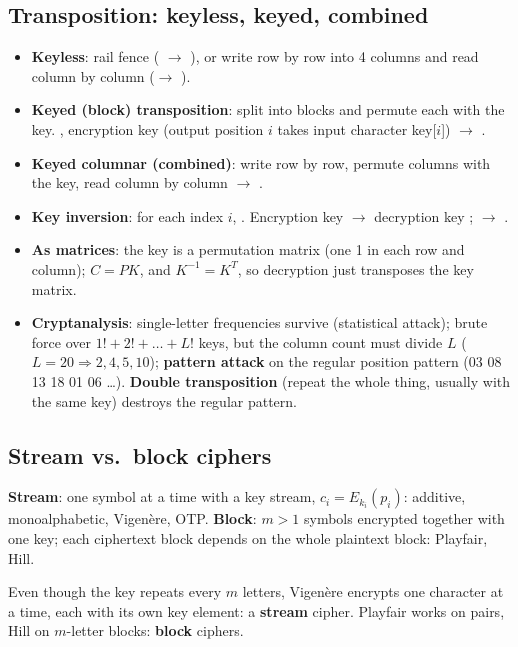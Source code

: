 \subsection{Transposition: keyless, keyed, combined}
\begin{itemize}
  \item \textbf{Keyless}: rail fence ( $\to$ ), or write row by row into 4 columns and read column by column ($\to$ ).
  \item \textbf{Keyed (block) transposition}: split into blocks and permute each with the key. , encryption key  (output position $i$ takes input character key[$i$]) $\to$ .
  \item \textbf{Keyed columnar (combined)}: write row by row, permute columns with the key, read column by column $\to$ .
  \item \textbf{Key inversion}: for each index $i$, . Encryption key  $\to$ decryption key ; \; $\to$ .
  \item \textbf{As matrices}: the key is a permutation matrix (one 1 in each row and column); $C = PK$, and $K^{-1} = K^{T}$, so decryption just transposes the key matrix.
  \item \textbf{Cryptanalysis}: single-letter frequencies survive (statistical attack); brute force over $1! + 2! + \dots + L!$ keys, but the column count must divide $L$ ($L = 20 \Rightarrow 2, 4, 5, 10$); \textbf{pattern attack} on the regular position pattern (03 08 13 18 01 06 \dots). \textbf{Double transposition} (repeat the whole thing, usually with the same key) destroys the regular pattern.
\end{itemize}

\subsection{Stream vs.\ block ciphers}
\textbf{Stream}: one symbol at a time with a key stream, $c_i = E_{k_i}(p_i)$: additive, monoalphabetic, Vigen\`ere, OTP. \textbf{Block}: $m > 1$ symbols encrypted together with one key; each ciphertext block depends on the whole plaintext block: Playfair, Hill.

\begin{trap}
Even though the key repeats every $m$ letters, Vigen\`ere encrypts one character at a time, each with its own key element: a \textbf{stream} cipher. Playfair works on pairs, Hill on $m$-letter blocks: \textbf{block} ciphers.
\end{trap}
